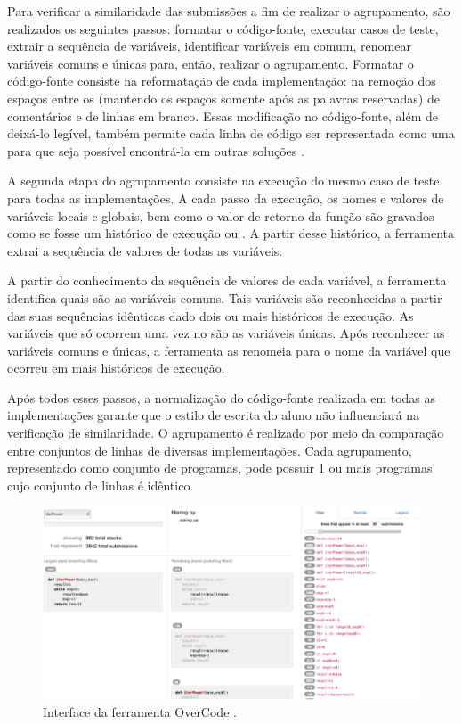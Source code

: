		Para verificar a similaridade das submissões a fim de realizar o agrupamento,
		são realizados os seguintes passos: formatar o código-fonte, executar casos
		de teste, extrair a sequência de variáveis, identificar variáveis em comum,
		renomear variáveis comuns e únicas para, então, realizar o agrupamento.
		Formatar o código-fonte consiste na reformatação de cada implementação: na
		remoção dos espaços entre os  (mantendo os espaços somente
		após as palavras reservadas) de comentários e de linhas em branco. Essas
		modificação no código-fonte, além de deixá-lo legível, também permite cada
		linha de código ser representada como uma  para que seja
		possível encontrá-la em outras soluções \cite{Glassman:2015}.
		
		A segunda etapa do agrupamento consiste na execução do mesmo caso de teste
		para todas as implementações. A cada passo da execução, os nomes e valores de
		variáveis locais e globais, bem como o valor de retorno da função são gravados
		como se fosse um histórico de execução ou . A partir desse
		histórico, a ferramenta extrai a sequência de valores de todas as variáveis.
		
		A partir do conhecimento da sequência de valores de cada variável, a ferramenta
		identifica quais são as variáveis comuns. Tais variáveis são reconhecidas a
		partir das suas sequências idênticas dado dois ou mais históricos de execução.
		As variáveis que só ocorrem uma vez no  são as variáveis únicas.
		Após reconhecer as variáveis comuns e únicas, a ferramenta as renomeia para o
		nome da variável que ocorreu em mais históricos de execução.
		
		Após todos esses passos, a normalização do código-fonte realizada em todas as
		implementações garante que o estilo de escrita do aluno não influenciará na
		verificação de similaridade. O agrupamento é realizado por meio da comparação entre
		conjuntos de linhas de diversas implementações. Cada agrupamento, representado
		como conjunto de programas, pode possuir 1 ou mais programas cujo conjunto de
		linhas é idêntico.
		
		\begin{figure}[ht]
			\centering
			\includegraphics[scale=0.4]{imagem/overCode.png}
			\caption[Interface da ferramenta OverCode]{Interface da ferramenta OverCode \cite{Glassman:2015}.}
			\label{fig:interfaceOverCode}
		\end{figure}
		
